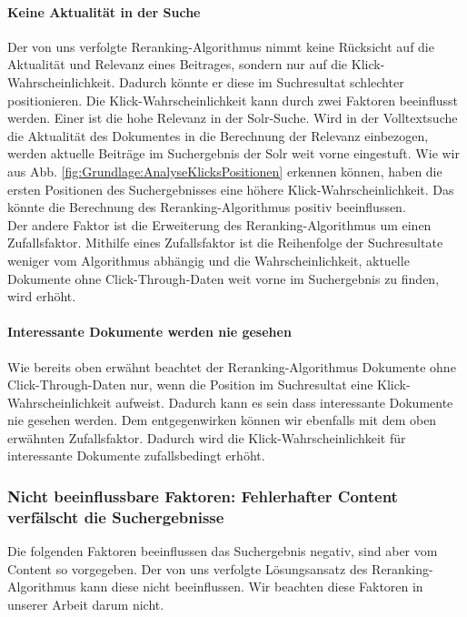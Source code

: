 \paragraph{Keine Aktualität in der Suche}
Der von uns verfolgte Reranking-Algorithmus nimmt keine Rücksicht auf die \glqq Aktualität\grqq{} und Relevanz eines Beitrages, sondern nur auf die Klick-Wahrscheinlichkeit. Dadurch könnte er diese im Suchresultat schlechter positionieren.  Die Klick-Wahrscheinlichkeit kann durch zwei Faktoren beeinflusst werden. Einer ist die hohe Relevanz in der Solr-Suche. Wird in der Volltextsuche die Aktualität des Dokumentes in die Berechnung der Relevanz einbezogen, werden aktuelle Beiträge im Suchergebnis der Solr weit vorne eingestuft. Wie wir aus Abb. \ref{fig:Grundlage:AnalyseKlicksPositionen} erkennen können, haben die ersten Positionen des Suchergebnisses eine höhere Klick-Wahrscheinlichkeit. Das könnte die Berechnung des Reranking-Algorithmus positiv beeinflussen. \\
Der andere Faktor ist die Erweiterung des Reranking-Algorithmus um einen Zufallsfaktor. Mithilfe eines Zufallsfaktor ist die Reihenfolge der Suchresultate weniger vom Algorithmus abhängig und die Wahrscheinlichkeit, aktuelle Dokumente ohne Click-Through-Daten weit vorne im Suchergebnis zu finden, wird erhöht.

\paragraph{Interessante Dokumente werden nie gesehen}
Wie bereits oben erwähnt beachtet der Reranking-Algorithmus Dokumente ohne Click-Through-Daten nur, wenn die Position im Suchresultat eine Klick-Wahrscheinlichkeit aufweist. Dadurch kann es sein dass interessante Dokumente nie gesehen werden. Dem entgegenwirken können wir ebenfalls mit dem oben erwähnten Zufallsfaktor. Dadurch wird die Klick-Wahrscheinlichkeit für interessante Dokumente zufallsbedingt erhöht.

\subsubsection{Nicht beeinflussbare Faktoren: Fehlerhafter Content verfälscht die Suchergebnisse}
\label{sec:Grundlagen:Grundbegriffe:SemantikUserInteraktionen:FehlerhafterContent}

Die folgenden Faktoren beeinflussen das Suchergebnis negativ, sind aber vom Content so vorgegeben. Der von uns verfolgte Lösungsansatz des Reranking-Algorithmus kann diese nicht beeinflussen. Wir beachten diese Faktoren in unserer Arbeit darum nicht.

